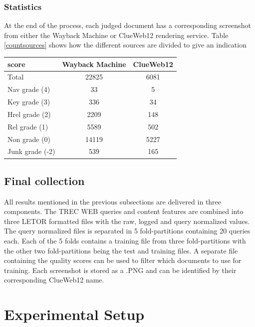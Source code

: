 \subsubsection{Statistics}
At the end of the process, each judged document has a corresponding screenshot from either the Wayback Machine or ClueWeb12 rendering service. Table \ref{countsources} shows how the different sources are divided to give an indication 
\begin{center}
  \begin{tabular}{ l | c | c  }
    score & Wayback Machine & ClueWeb12 \\
    \hline
    Total & 22825 & 6081 \\
    Nav grade (4) & 33 & 5 \\
    Key grade (3) & 336 & 34 \\
    Hrel grade (2) & 2209 & 148 \\
    Rel grade (1) & 5589 & 502 \\
    Non grade (0) & 14119 & 5227 \\
    Junk grade (-2) & 539 & 165 \\
    \hline
  \end{tabular}
   \label{tab:countsources} 
\end{center}

\subsection{Final collection}
All results mentioned in the previous subsections are delivered in three components. The TREC WEB queries and content features are combined into three LETOR formatted files with the raw, logged and query normalized values. The query normalized files is separated in 5 fold-partitions containing 20 queries each. Each of the 5 folds contains a training file from three fold-partitions with the other two fold-partitions being the test and training files. A separate file containing the quality scores can be used to filter which documents to use for training. Each screenshot is stored as a .PNG and can be identified by their corresponding ClueWeb12 name. 

\section{Experimental Setup}\label{sec:experiments}


